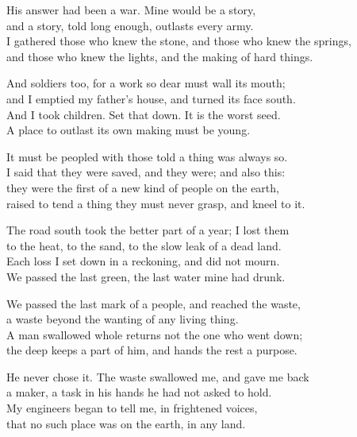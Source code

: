 \begin{founder}
His answer had been a war. Mine would be a story,\\
and a story, told long enough, outlasts every army.\\
I gathered those who knew the stone, and those who knew the springs,\\
and those who knew the lights, and the making of hard things.\\
\medskip

And soldiers too, for a work so dear must wall its mouth;\\
and I emptied my father's house, and turned its face south.\\
And I took children. Set that down. It is the worst seed.\\
A place to outlast its own making must be young.\\
\medskip

It must be peopled with those told a thing was always so.\\
I said that they were saved, and they were; and also this:\\
they were the first of a new kind of people on the earth,\\
raised to tend a thing they must never grasp, and kneel to it.\\
\medskip

The road south took the better part of a year; I lost them\\
to the heat, to the sand, to the slow leak of a dead land.\\
Each loss I set down in a reckoning, and did not mourn.\\
We passed the last green, the last water mine had drunk.\\
\medskip

We passed the last mark of a people, and reached the waste,\\
a waste beyond the wanting of any living thing.\\
A man swallowed whole returns not the one who went down;\\
the deep keeps a part of him, and hands the rest a purpose.\\
\medskip

He never chose it. The waste swallowed me, and gave me back\\
a maker, a task in his hands he had not asked to hold.\\
My engineers began to tell me, in frightened voices,\\
that no such place was on the earth, in any land.\\
\medskip


\end{founder}

